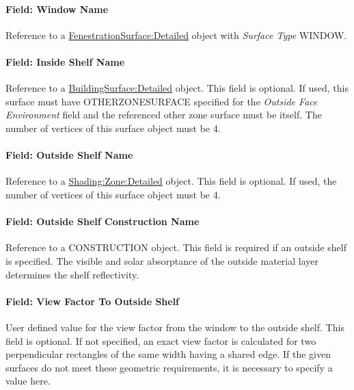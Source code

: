 \paragraph{Field: Window Name}\label{field-window-name-1}

Reference to a \hyperref[fenestrationsurfacedetailed]{FenestrationSurface:Detailed} object with \emph{Surface Type} WINDOW.

\paragraph{Field: Inside Shelf Name}\label{field-inside-shelf-name}

Reference to a \hyperref[buildingsurfacedetailed]{BuildingSurface:Detailed} object. This field is optional. If used, this surface must have OTHERZONESURFACE specified for the \emph{Outside Face Environment} field and the referenced other zone surface must be itself. The number of vertices of this surface object must be 4.

\paragraph{Field: Outside Shelf Name}\label{field-outside-shelf-name}

Reference to a \hyperref[shadingzonedetailed-000]{Shading:Zone:Detailed} object. This field is optional. If used, the number of vertices of this surface object must be 4.

\paragraph{Field: Outside Shelf Construction Name}\label{field-outside-shelf-construction-name}

Reference to a CONSTRUCTION object. This field is required if an outside shelf is specified. The visible and solar absorptance of the outside material layer determines the shelf reflectivity.

\paragraph{Field: View Factor To Outside Shelf}\label{field-view-factor-to-outside-shelf}

User defined value for the view factor from the window to the outside shelf. This field is optional. If not specified, an exact view factor is calculated for two perpendicular rectangles of the same width having a shared edge. If the given surfaces do not meet these geometric requirements, it is necessary to specify a value here.

